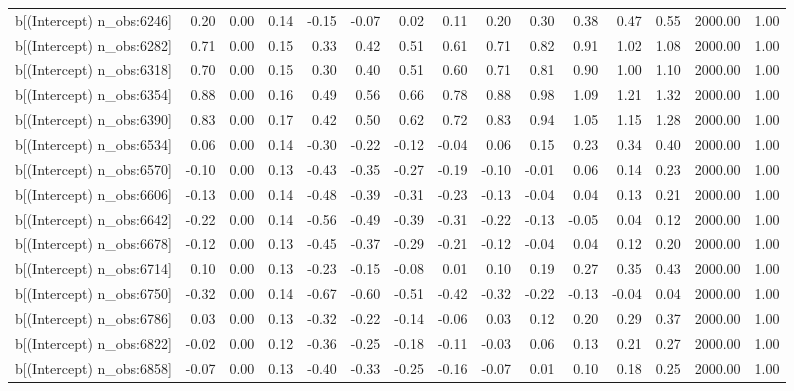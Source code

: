 \begin{table}[ht]
\begin{tabular}{rrrrrrrrrrrrrrr}
  b[(Intercept) n\_obs:6246] & 0.20 & 0.00 & 0.14 & -0.15 & -0.07 & 0.02 & 0.11 & 0.20 & 0.30 & 0.38 & 0.47 & 0.55 & 2000.00 & 1.00 \\ 
  b[(Intercept) n\_obs:6282] & 0.71 & 0.00 & 0.15 & 0.33 & 0.42 & 0.51 & 0.61 & 0.71 & 0.82 & 0.91 & 1.02 & 1.08 & 2000.00 & 1.00 \\ 
  b[(Intercept) n\_obs:6318] & 0.70 & 0.00 & 0.15 & 0.30 & 0.40 & 0.51 & 0.60 & 0.71 & 0.81 & 0.90 & 1.00 & 1.10 & 2000.00 & 1.00 \\ 
  b[(Intercept) n\_obs:6354] & 0.88 & 0.00 & 0.16 & 0.49 & 0.56 & 0.66 & 0.78 & 0.88 & 0.98 & 1.09 & 1.21 & 1.32 & 2000.00 & 1.00 \\ 
  b[(Intercept) n\_obs:6390] & 0.83 & 0.00 & 0.17 & 0.42 & 0.50 & 0.62 & 0.72 & 0.83 & 0.94 & 1.05 & 1.15 & 1.28 & 2000.00 & 1.00 \\ 
  b[(Intercept) n\_obs:6534] & 0.06 & 0.00 & 0.14 & -0.30 & -0.22 & -0.12 & -0.04 & 0.06 & 0.15 & 0.23 & 0.34 & 0.40 & 2000.00 & 1.00 \\ 
  b[(Intercept) n\_obs:6570] & -0.10 & 0.00 & 0.13 & -0.43 & -0.35 & -0.27 & -0.19 & -0.10 & -0.01 & 0.06 & 0.14 & 0.23 & 2000.00 & 1.00 \\ 
  b[(Intercept) n\_obs:6606] & -0.13 & 0.00 & 0.14 & -0.48 & -0.39 & -0.31 & -0.23 & -0.13 & -0.04 & 0.04 & 0.13 & 0.21 & 2000.00 & 1.00 \\ 
  b[(Intercept) n\_obs:6642] & -0.22 & 0.00 & 0.14 & -0.56 & -0.49 & -0.39 & -0.31 & -0.22 & -0.13 & -0.05 & 0.04 & 0.12 & 2000.00 & 1.00 \\ 
  b[(Intercept) n\_obs:6678] & -0.12 & 0.00 & 0.13 & -0.45 & -0.37 & -0.29 & -0.21 & -0.12 & -0.04 & 0.04 & 0.12 & 0.20 & 2000.00 & 1.00 \\ 
  b[(Intercept) n\_obs:6714] & 0.10 & 0.00 & 0.13 & -0.23 & -0.15 & -0.08 & 0.01 & 0.10 & 0.19 & 0.27 & 0.35 & 0.43 & 2000.00 & 1.00 \\ 
  b[(Intercept) n\_obs:6750] & -0.32 & 0.00 & 0.14 & -0.67 & -0.60 & -0.51 & -0.42 & -0.32 & -0.22 & -0.13 & -0.04 & 0.04 & 2000.00 & 1.00 \\ 
  b[(Intercept) n\_obs:6786] & 0.03 & 0.00 & 0.13 & -0.32 & -0.22 & -0.14 & -0.06 & 0.03 & 0.12 & 0.20 & 0.29 & 0.37 & 2000.00 & 1.00 \\ 
  b[(Intercept) n\_obs:6822] & -0.02 & 0.00 & 0.12 & -0.36 & -0.25 & -0.18 & -0.11 & -0.03 & 0.06 & 0.13 & 0.21 & 0.27 & 2000.00 & 1.00 \\ 
  b[(Intercept) n\_obs:6858] & -0.07 & 0.00 & 0.13 & -0.40 & -0.33 & -0.25 & -0.16 & -0.07 & 0.01 & 0.10 & 0.18 & 0.25 & 2000.00 & 1.00 \\ 

\end{tabular}
\end{table}
